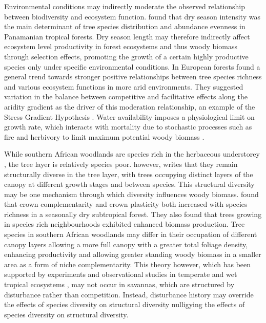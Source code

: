 \documentclass[11pt,a4paper]{article}
\begin{document}
Environmental conditions may indirectly moderate the observed relationship between biodiversity and ecosystem function. \citet{Condit2013} found that dry season intensity was the main determinant of tree species distribution and abundance evenness in Panamanian tropical forests. Dry season length may therefore indirectly affect ecosystem level productivity in forest ecosystems and thus woody biomass through selection effects, promoting the growth of a certain highly productive species only under specific environmental conditions. In European forests \citep{Ratcliffe2017} found a general trend towards stronger positive relationships between tree species richness and various ecosystem functions in more arid environments. They suggested variation in the balance between competitive and facilitative effects along the aridity gradient as the driver of this moderation relationship, an example of the Stress Gradient Hypothesis \citep{Dohn2013}. Water availability imposes a physiological limit on growth rate, which interacts with mortality due to stochastic processes such as fire and herbivory to limit maximum potential woody biomass \citep{Sankaran2005}. 


While southern African woodlands are species rich in the herbaceous understorey \citep{Murphy2016}, the tree layer is relatively species poor. \citet{Solbrig1996} however, writes that they remain structurally diverse in the tree layer, with trees occupying distinct layers of the canopy at different growth stages and between species. This structural diversity may be one mechanism through which diversity influences woody biomass. \citep{Kunz2019} found that crown complementarity and crown plasticity both increased with species richness in a seasonally dry subtropical forest. They also found that trees growing in species rich neighbourhoods exhibited enhanced biomass production. Tree species in southern African woodlands may differ in their occupation of different canopy layers allowing a more full canopy with a greater total foliage density, enhancing productivity and allowing greater standing woody biomass in a smaller area as a form of niche complementarity. This theory however, which has been supported by experiments and observational studies in temperate and wet tropical ecosystems \citep{Hardiman2011, Stark2012}, may not occur in savannas, which are structured by disturbance rather than competition. Instead, disturbance history may override the effects of species diversity on structural diversity nulligying the effects of species diversity on structural diversity.
\end{document}
